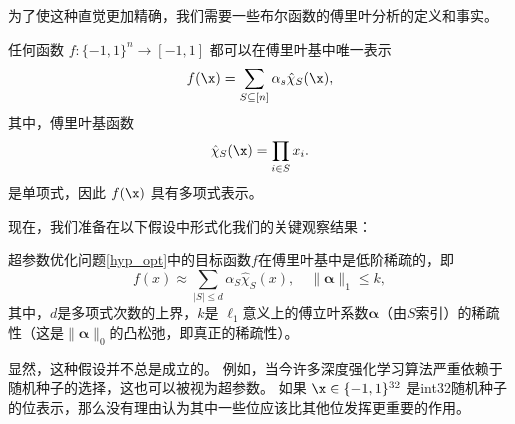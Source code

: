 为了使这种直觉更加精确，我们需要一些布尔函数的傅里叶分析的定义和事实。
\begin{fact}
	任何函数 $f: \{-1, 1\}^n \rightarrow [-1, 1]$ 都可以在傅里叶基中唯一表示
	$$
	f(\x) = \sum_{S \subseteq [n]} \alpha_s \hat{\chi}_S (\x),
	$$
	其中，傅里叶基函数
	$$
	\hat{\chi}_S (\x) = \prod_{i \in S} x_i.
	$$
	是单项式，因此 $f(\x)$ 具有多项式表示。
\end{fact}
现在，我们准备在以下假设中形式化我们的关键观察结果：
\begin{assumption}
	\label{asp_sparsity}
	超参数优化问题\eqref{hyp_opt}中的目标函数$f$在傅里叶基中是低阶稀疏的，即
	\begin{equation}
	\label{asp}		
	f(x) \approx \sum_{|S| \le d} \alpha_S \hat{\chi}_S (x), \quad \|\pmb{\alpha}\|_1 \le k,
	\end{equation}
	其中，$d$是多项式次数的上界，$k$是 $\ell_1$意义上的傅立叶系数$\pmb{\alpha}$（由$S$索引）的稀疏性（这是$\|\pmb{\alpha}\|_0$的凸松弛，即真正的稀疏性）。
\end{assumption}

\begin{remark}
	显然，这种假设并不总是成立的。
	例如，当今许多深度强化学习算法严重依赖于随机种子的选择，这也可以被视为超参数。
	如果 $\x \in \{-1,1\}^{32}$ 是int32随机种子的位表示，那么没有理由认为其中一些位应该比其他位发挥更重要的作用。
\end{remark}

